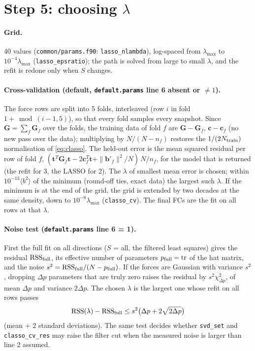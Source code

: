 \documentclass[11pt,a4paper]{article}
\newcommand{\bG}{\mathbf G}
\newcommand{\bb}{\mathbf b}
\newcommand{\bc}{\mathbf c}
\newcommand{\bt}{\mathbf t}
\newcommand{\code}[1]{\texttt{#1}}
\begin{document}
\section{\texorpdfstring{Step 5: choosing $\lambda$}{Step 5: choosing lambda}}\label{sec:cv}
\paragraph{Grid.} 40 values (\code{common/params.f90}: \code{lasso\_nlambda}), log-spaced from $\lambda_{\max}$ to $10^{-4}\lambda_{\max}$
(\code{lasso\_epsratio}); the path is solved from large to small $\lambda$, and the refit is redone only when $S$ changes.

\paragraph{Cross-validation (default, \code{default.params} line 6 absent or $\ne1$).} The force rows are split into 5 folds,
interleaved (row $i$ in fold $1+\bmod(i-1,5)$), so that every fold samples every snapshot. Since $\bG=\sum_f\bG_f$ over the
folds, the training data of fold $f$ are $\bG-\bG_f$, $\bc-\bc_f$ (no new pass over the data); multiplying by $N/(N-n_f)$
restores the $1/(2N_{\rm train})$ normalisation of \eqref{eq:classo}. The held-out error is the mean squared residual per
row of fold $f$, $(\bt^T\bG_f\bt-2\bc_f^T\bt+\|\bb'_f\|^2/N)\,N/n_f$, for the model that is returned (the refit for 3, the
LASSO for 2). The $\lambda$ of smallest mean error is chosen; within $10^{-13}\langle b^2\rangle$ of the minimum (round-off ties,
exact data) the largest such $\lambda$. If the minimum is at the end of the grid, the grid is extended by two decades at the
same density, down to $10^{-8}\lambda_{\max}$ (\code{classo\_cv}). The final FCs are the fit on all rows at that $\lambda$.

\paragraph{Noise test (\code{default.params} line 6 = 1).}\label{sec:noise} First the full fit on all directions ($S$ = all, the
filtered least squares) gives the residual $\mathrm{RSS}_{\rm full}$, its effective number of parameters
$p_{\rm full}=\mathrm{tr}$ of the hat matrix, and the noise $s^2=\mathrm{RSS}_{\rm full}/(N-p_{\rm full})$. If the forces are
Gaussian with variance $s^2$, dropping $\Delta p$ parameters that are truly zero raises the residual by $s^2\chi^2_{\Delta p}$,
of mean $\Delta p$ and variance $2\Delta p$. The chosen $\lambda$ is the largest one whose refit on all rows passes
\begin{equation}
\mathrm{RSS}(\lambda)-\mathrm{RSS}_{\rm full}\le s^2\big(\Delta p+2\sqrt{2\Delta p}\big)
\end{equation}
(mean $+$ 2 standard deviations). The same test decides whether \code{svd\_set} and \code{classo\_cv\_res} may raise the
filter cut when the measured noise is larger than line 2 assumed.
\end{document}
